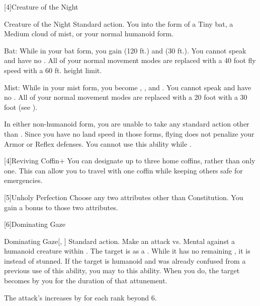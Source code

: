       [4]{Creature of the Night}
      \begin{magicalattuneability}{Creature of the Night}{}
        \abilityusagetime Standard action.
        \rankline
        You  into the form of a Tiny bat, a Medium cloud of mist, or your normal humanoid form.
        \begin{raggeditemize}
          \item Bat: While in your bat form, you gain  (120 ft.) and  (30 ft.).
            You cannot speak and have no .
            All of your normal movement modes are replaced with a 40 foot fly speed with a 60 ft. height limit.
          \item Mist: While in your mist form, you become , , and .
            You cannot speak and have no .
            All of your normal movement modes are replaced with a 20 foot  with a 30 foot  (see ).
        \end{raggeditemize}

        In either non-humanoid form, you are unable to take any standard action other than .
        Since you have no land speed in those forms, flying does not penalize your Armor or Reflex defenses.
        You cannot use this ability while \paralyzed.
      \end{magicalattuneability}

      [4]{Reviving Coffin+} You can designate up to three home coffins, rather than only one.
      This can allow you to travel with one coffin while keeping others safe for emergencies.

    [5]{Unholy Perfection} Choose any two attributes other than Constitution.
      You gain a  bonus to those two attributes.

      [6]{Dominating Gaze}
      \begin{magicalactiveability}{Dominating Gaze}[, ]
        \abilityusagetime Standard action.
        \rankline
        Make an attack vs. Mental against a humanoid creature within \shortrange.
        \hit The target is \stunned as a .
        While it has no remaining , it is \confused instead of stunned.
        \crit If the target is humanoid and was already confused from a previous use of this ability, you may  to this ability.
        When you do, the target becomes \dominated by you for the duration of that attunement.

        \rankline
        The attack's  increases by  for each rank beyond 6.
      \end{magicalactiveability}

